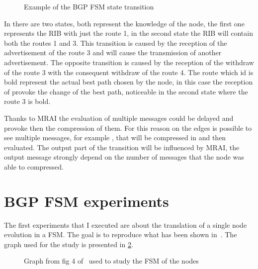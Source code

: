\begin{figure}[h]
    \begin{center}
        
    \end{center}
	\caption{Example of the \ac{BGP} \ac{FSM} state transition}
    \label{fig:fsm_example}
\end{figure}

In  there are two states, both represent the knowledge of
the node, the first one represents the \ac{RIB} with just the route \num{1}, in
the second state the \ac{RIB} will contain both the routes \num{1} and \num{3}.
This transition is caused by the reception of the advertisement of the route
\num{3} and will cause the transmission of another advertisement.
The opposite transition is caused by the reception of the withdraw of the route
\num{3} with the consequent withdraw of the route \num{4}.
The route which id is bold represent the actual best path chosen by the node, in
this case the reception of  provoke the change of the best path, noticeable
in the second state where the route \num{3} is bold.

Thanks to \ac{MRAI} the evaluation of multiple messages could be delayed and
provoke then the compression of them.
For this reason on the edges is possible to see multiple messages, for example
\q{[A1W1A1]}, that will be compressed in \q{[A1]} and then evaluated.
The output part of the transition will be influenced by \ac{MRAI}, the output
message strongly depend on the number of messages that the node was able
to compressed.


\section{BGP FSM experiments}
\label{sec:bgp_fsm_experiments}

The first experiments that I executed are about the translation of a single
node evolution in a \ac{FSM}.
The goal is to reproduce what has been shown in~\cite{griffinFSM}.
The graph used for the study is presented in \cref{fig:griffin_fig_4}.

\begin{figure}[h]
    \begin{center}
        
    \end{center}
	\caption{Graph from fig 4 of~\cite{griffinFSM} used to study the \ac{FSM}
		of the nodes}
    \label{fig:griffin_fig_4}
\end{figure}

